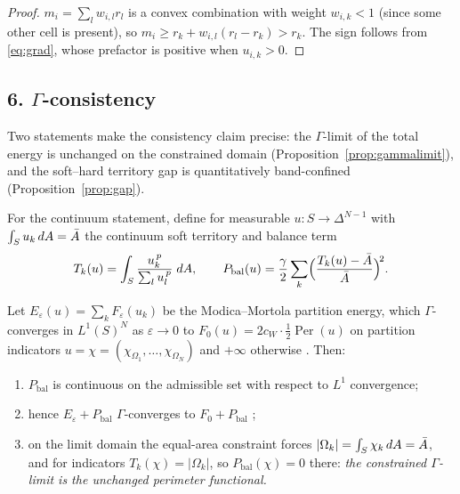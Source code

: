 \documentclass[11pt,a4paper]{article}
\begin{document}
\begin{proof}
$m_i = \sum_l w_{i,l} r_l$ is a convex combination with weight
$w_{i,k}<1$ (since some other cell is present), so
$m_i \ge r_k + w_{i,l}(r_l - r_k) > r_k$. The sign follows from
\eqref{eq:grad}, whose prefactor is positive when $u_{i,k}>0$.
\end{proof}

\subsection{6. \texorpdfstring{$\Gamma$}{Gamma}-consistency}
\label{sec:gammaconsistency}

Two statements make the consistency claim precise: the $\Gamma$-limit of the
total energy is unchanged on the constrained domain (Proposition~\ref{prop:gammalimit}),
and the soft--hard territory gap is quantitatively band-confined
(Proposition~\ref{prop:gap}).

For the continuum statement, define for measurable
$u:S\to\Delta^{N-1}$ with $\int_S u_k\,dA=\bar{A}$ the continuum soft territory
and balance term
\[
  T_k(u) = \int_S \frac{u_k^{\,p}}{\sum_l u_l^{\,p}}\; dA,
  \qquad
  P_{\mathrm{bal}}(u) = \frac{\gamma}{2}\sum_k
      \Bigl(\frac{T_k(u)-\bar{A}}{\bar{A}}\Bigr)^{\!2}.
\]

\begin{prop}
\label{prop:gammalimit}
Let $E_\varepsilon(u) = \sum_k F_\varepsilon(u_k)$ be the Modica--Mortola
partition energy, which $\Gamma$-converges in $L^1(S)^N$ as
$\varepsilon\to0$ to $F_0(u) = 2c_W\cdot\tfrac12\operatorname{Per}(u)$ on
partition indicators $u=\chi=(\chi_{\Omega_1},\dots,\chi_{\Omega_N})$ and
$+\infty$ otherwise \cite{modica1977esempio,modica1987gradient,bogosel2017partitions}.
Then:
\begin{enumerate}[itemsep=1pt]
\item $P_{\mathrm{bal}}$ is continuous on the admissible set with respect to
      $L^1$ convergence;
\item hence $E_\varepsilon + P_{\mathrm{bal}}$ $\Gamma$-converges to
      $F_0 + P_{\mathrm{bal}}$ \cite[Remark~1.7]{braides2002gamma};
\item on the limit domain the equal-area constraint forces
      $|\Omega_k| = \int_S \chi_k\,dA = \bar{A}$, and for indicators
      $T_k(\chi)=|\Omega_k|$, so $P_{\mathrm{bal}}(\chi)=0$ there:
      \emph{the constrained $\Gamma$-limit is the unchanged perimeter
      functional.}
\end{enumerate}
\end{prop}
\end{document}
